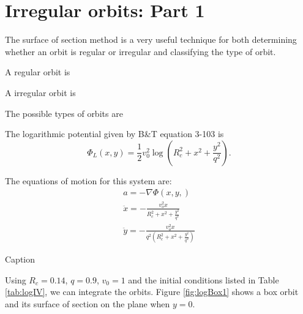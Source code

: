 \section{Irregular orbits: Part 1}
The surface of section method is a very useful technique for both determining whether an orbit is regular or irregular and classifying the type of orbit.

A regular orbit is

A irregular orbit is

The possible types of orbits are

The logarithmic potential given by B\&T equation 3-103 is
\begin{equation}
    \Phi_L(x,y)=\frac{1}{2}v_0^2\log\left(R_c^2+x^2+\frac{y^2}{q^2}\right).
\end{equation}

The equations of motion for this system are:
\begin{align}
    a=-\nabla\Phi(x,y,)\\
    \ddot{x}=-\frac{v_o^2x}{R_c^2+x^2+\frac{y^2}{q^2}}\\
    \ddot{y}=-\frac{v_o^2x}{q^2\left(R_c^2+x^2+\frac{y^2}{q^2}\right)}
\end{align}

\begin{table}[]
    \centering
    
    \caption{Caption}
    \label{tab:logIV}
\end{table}

Using $R_c=0.14$, $q=0.9$, $v_0=1$ and the initial conditions listed in Table \ref{tab:logIV}, we can integrate the orbits. Figure \ref{fig:logBox1} shows a box orbit and its surface of section on the plane when $y=0$.

